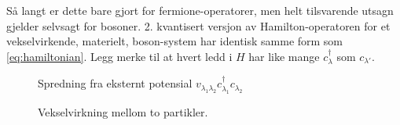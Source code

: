 Så langt er dette bare gjort for fermione-operatorer, men helt tilsvarende utsagn gjelder selvsagt for bosoner. 2. kvantisert versjon av Hamilton-operatoren for et vekselvirkende, materielt, boson-system har identisk samme form som \ref{eq:hamiltonian}. Legg merke til at hvert ledd i $H$ har like mange $c_\lambda^\dagger$ som $c_{\lambda'}$.


\begin{figure}
\centering

\caption{Spredning fra eksternt potensial $v_{\lambda_1\lambda_2}c_{\lambda_1}^\dagger c_{\lambda_2}$}
\end{figure}


\begin{figure}
\centering

\caption{Vekselvirkning mellom to partikler.}
\end{figure}
